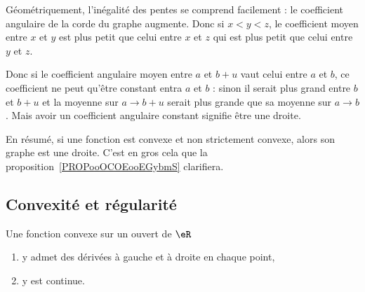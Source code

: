 Géométriquement, l'inégalité des pentes se comprend facilement : le coefficient angulaire de la corde du graphe augmente. Donc si \( x<y<z\), le coefficient moyen entre \( x\) et \( y\) est plus petit que celui entre \( x\) et \( z\) qui est plus petit que celui entre \( y\) et \( z\).

Donc si le coefficient angulaire moyen entre \( a\) et \( b+u\) vaut celui entre \( a\) et \( b\), ce coefficient ne peut qu'être constant entra \( a\) et \( b\) : sinon il serait plus grand entre \( b\) et \( b+u\) et la moyenne sur \( a\to b+u\) serait plus grande que sa moyenne sur \( a\to b\). Mais avoir un coefficient angulaire constant signifie être une droite.

En résumé, si une fonction est convexe et non strictement convexe, alors son graphe est une droite. C'est en gros cela que la proposition~\ref{PROPooOCOEooEGybmS} clarifiera.

\subsection{Convexité et régularité}

\begin{lemma}   \label{LemKLTsHIQ}
	Une fonction convexe sur un ouvert de \( \eR\)
	\begin{enumerate}
		\item
		      y admet des dérivées à gauche et à droite en chaque point,
		\item
		      y est continue.
	\end{enumerate}
\end{lemma}

